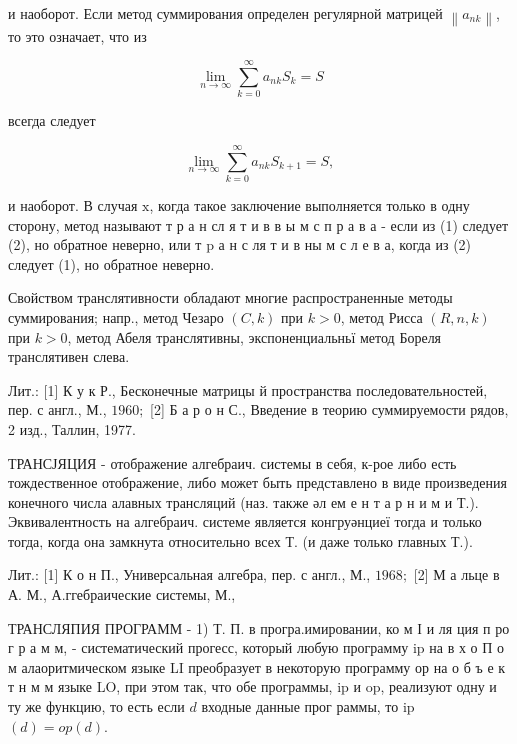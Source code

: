 \documentclass[10pt]{article}
\begin{document}
и наоборот. Если метод суммирования определен регулярной матрицей $\left\|a_{n k}\right\|$, то это означает, что из



\[

\lim _{n \rightarrow \infty} \sum_{k=0}^{\infty} a_{n k} S_{k}=S

\]



всегда следует



\[

\lim _{n \rightarrow \infty} \sum_{k=0}^{\infty} a_{n k} S_{k+1}=S,

\]



и наоборот. В случая $\mathrm{x}$, когда такое заключение выполняется только в одну сторону, метод называют т р а н сл я т и в в ы м с п р а в а - если из (1) следует (2), но обратное неверно, или т $\mathrm{p}$ а н с ля т и в ны м с л е в а, когда из (2) следует (1), но обратное неверно.



Свойством транслятивности обладают многие распространенные методы суммирования; напр., метод Чезаро $(C, k)$ при $k>0$, метод Рисса $(R, n, k)$ при $k>0$, метод Абеля транслятивны, экспоненциальньї метод Бореля транслятивен слева.



Лит.: [1] К у к Р., Бесконечные матрицы й пространства последовательностей, пер. с англ., М., $1960 ;$ [2] Б а р о н С., Введение в теорию суммируемости рядов, 2 изд., Таллин, 1977.



ТРАНСЈЯЦИЯ - отображение алгебраич. системы в себя, к-рое либо есть тождественное отображение, либо может быть представлено в виде произведения конечного числа алавных трансляций (наз. также әл ем е н т а р н и м и Т.). Эквивалентность на алгебраич. системе является конгруәнциеї тогда и только тогда, когда она замкнута относительно всех Т. (и даже только главных Т.).



Лит.: [1] К о н П., Универсальная алгебра, пер. с англ., М., $1968 ;$ [2] М а льце в А. М., А.ггебраические системы, М.,



ТРАНСЛЯПИЯ ПРОГРАММ - 1) Т. П. в програ.имировании, ко м І и ля ция п ро г р а м м, - систематический прогесс, который любую программу ip на в х о П о м алаоритмическом языке LI преобразует в некоторую программу ор на о б ъ е к т н м м языке LO, при этом так, что обе программы, ip и op, реализуют одну и ту же функцию, то есть если $d$ входные данные прог раммы, то ip $(d)=o p(d)$.
\end{document}
